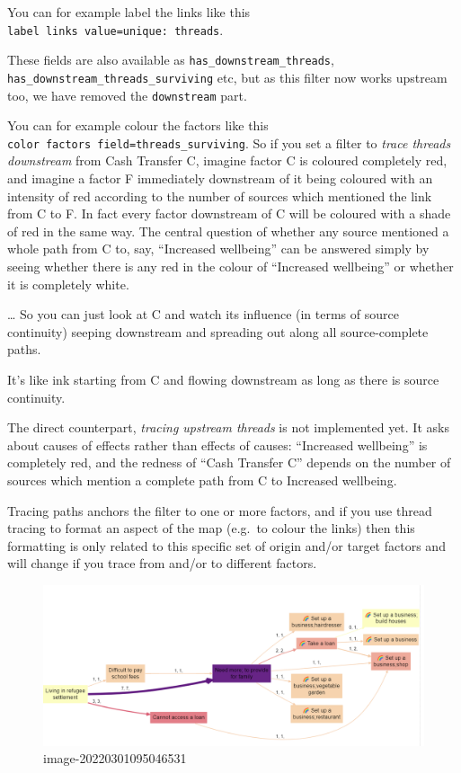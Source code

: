 \documentclass[
]{book}
\begin{document}
You can for example label the links like this \texttt{label\ links\ value=unique:\ threads}.

These fields are also available as \texttt{has\_downstream\_threads}, \texttt{has\_downstream\_threads\_surviving} etc, but as this filter now works upstream too, we have removed the \texttt{downstream} part.

You can for example colour the factors like this \texttt{color\ factors\ field=threads\_surviving}. So if you set a filter to \emph{trace threads downstream} from Cash Transfer C, imagine factor C is coloured completely red, and imagine a factor F immediately downstream of it being coloured with an intensity of red according to the number of sources which mentioned the link from C to F. In fact every factor downstream of C will be coloured with a shade of red in the same way. The central question of whether any source mentioned a whole path from C to, say, ``Increased wellbeing'' can be answered simply by seeing whether there is any red in the colour of ``Increased wellbeing'' or whether it is completely white.

\ldots{} So you can just look at C and watch its influence (in terms of source continuity) seeping downstream and spreading out along all source-complete paths.

It's like ink starting from C and flowing downstream as long as there is source continuity.

The direct counterpart, \emph{tracing upstream threads} is not implemented yet. It asks about causes of effects rather than effects of causes: ``Increased wellbeing'' is completely red, and the redness of ``Cash Transfer C'' depends on the number of sources which mention a complete path from C to Increased wellbeing.

Tracing paths anchors the filter to one or more factors, and if you use thread tracing to format an aspect of the map (e.g.~to colour the links) then this formatting is only related to this specific set of origin and/or target factors and will change if you trace from and/or to different factors.

\begin{figure}
\centering
\includegraphics{_assets/image-20220301095046531.png}
\caption{image-20220301095046531}
\end{figure}
\end{document}

